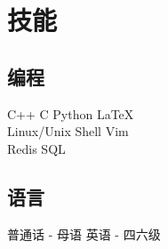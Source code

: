 \documentclass[]{deedy-resume-openfont}
\begin{document}
\begin{minipage}[t]{0.25\textwidth}

\section{技能}
\sectionsep
\subsection{编程}
C++ \textbullet{} C \textbullet{} Python \textbullet{} \LaTeX \\
Linux/Unix \textbullet{} Shell \textbullet{} Vim \\
Redis \textbullet{} SQL \\ 
\sectionsep

\subsection{语言}
普通话 - 母语 \textbullet{} 英语 - 四六级\\
\sectionsep

%
%

\end{minipage} 
\hfill
\end{document}
